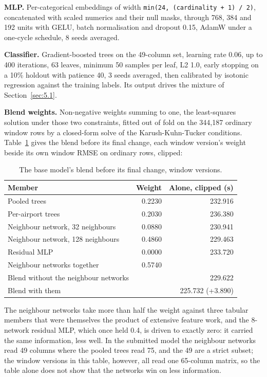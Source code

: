 \documentclass[
  manuscript=article,
  layout=preprint,
  year=2026,
  volume=x,
]{extra/joas}
\begin{document}
\textbf{MLP.} Per-categorical embeddings of width \texttt{min(24,\ (cardinality\ +\ 1)\ /\ 2)}, concatenated with scaled numerics and their null masks, through 768, 384 and 192 units with GELU, batch normalisation and dropout 0.15, AdamW under a one-cycle schedule, 8 seeds averaged.

\textbf{Classifier.} Gradient-boosted trees on the 49-column set, learning rate 0.06, up to 400 iterations, 63 leaves, minimum 50 samples per leaf, L2 1.0, early stopping on a 10\% holdout with patience 40, 3 seeds averaged, then calibrated by isotonic regression against the training labels. Its output drives the mixture of Section~\ref{sec:5.1}.

\textbf{Blend weights.} Non-negative weights summing to one, the least-squares solution under those two constraints, fitted out of fold on the 344,187 ordinary window rows by a closed-form solve of the Karush-Kuhn-Tucker conditions. Table~\ref{tab:18} gives the blend before its final change, each window version's weight beside its own window RMSE on ordinary rows, clipped:

\begin{table}[htbp!]
  \centering
  \small
  \setlength{\tabcolsep}{5pt}\renewcommand{\arraystretch}{1.15}
  \caption{The base model's blend before its final change, window versions.}
  \label{tab:18}
  \begin{tabular*}{\linewidth}{@{\extracolsep{\fill}}lrr}
  \toprule
  \textbf{Member} & \textbf{Weight} & \textbf{Alone, clipped (s)} \\
  \midrule
  Pooled trees & 0.2230 & 232.916 \\
  Per-airport trees & 0.2030 & 236.380 \\
  Neighbour network, 32 neighbours & 0.0880 & 230.941 \\
  Neighbour network, 128 neighbours & 0.4860 & 229.463 \\
  Residual MLP & 0.0000 & 233.720 \\
  Neighbour networks together & 0.5740 &  \\
  Blend without the neighbour networks &  & 229.622 \\
  Blend with them &  & 225.732 (+3.890) \\
  \bottomrule
  \end{tabular*}
\end{table}

The neighbour networks take more than half the weight against three tabular members that were themselves the product of extensive feature work, and the 8-network residual MLP, which once held 0.4, is driven to exactly zero: it carried the same information, less well. In the submitted model the neighbour networks read 49 columns where the pooled trees read 75, and the 49 are a strict subset; the window versions in this table, however, all read one 65-column matrix, so the table alone does not show that the networks win on less information.
\end{document}
